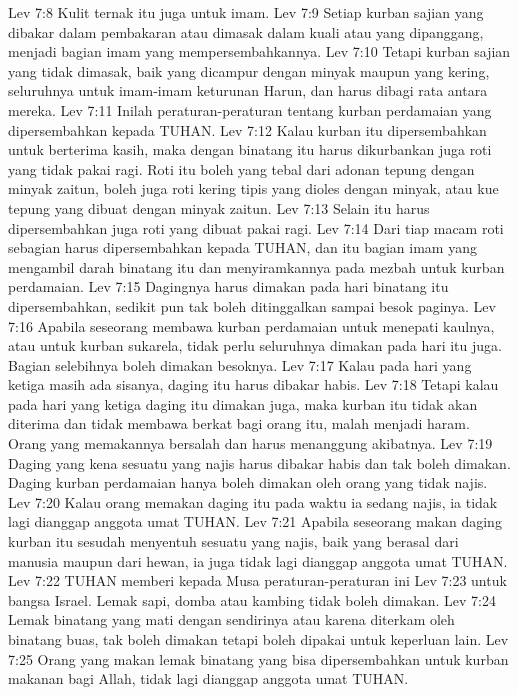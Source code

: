 Lev 7:8  Kulit ternak itu juga untuk imam.
Lev 7:9  Setiap kurban sajian yang dibakar dalam pembakaran atau dimasak dalam kuali atau yang dipanggang, menjadi bagian imam yang mempersembahkannya.
Lev 7:10  Tetapi kurban sajian yang tidak dimasak, baik yang dicampur dengan minyak maupun yang kering, seluruhnya untuk imam-imam keturunan Harun, dan harus dibagi rata antara mereka.
Lev 7:11  Inilah peraturan-peraturan tentang kurban perdamaian yang dipersembahkan kepada TUHAN.
Lev 7:12  Kalau kurban itu dipersembahkan untuk berterima kasih, maka dengan binatang itu harus dikurbankan juga roti yang tidak pakai ragi. Roti itu boleh yang tebal dari adonan tepung dengan minyak zaitun, boleh juga roti kering tipis yang dioles dengan minyak, atau kue tepung yang dibuat dengan minyak zaitun.
Lev 7:13  Selain itu harus dipersembahkan juga roti yang dibuat pakai ragi.
Lev 7:14  Dari tiap macam roti sebagian harus dipersembahkan kepada TUHAN, dan itu bagian imam yang mengambil darah binatang itu dan menyiramkannya pada mezbah untuk kurban perdamaian.
Lev 7:15  Dagingnya harus dimakan pada hari binatang itu dipersembahkan, sedikit pun tak boleh ditinggalkan sampai besok paginya.
Lev 7:16  Apabila seseorang membawa kurban perdamaian untuk menepati kaulnya, atau untuk kurban sukarela, tidak perlu seluruhnya dimakan pada hari itu juga. Bagian selebihnya boleh dimakan besoknya.
Lev 7:17  Kalau pada hari yang ketiga masih ada sisanya, daging itu harus dibakar habis.
Lev 7:18  Tetapi kalau pada hari yang ketiga daging itu dimakan juga, maka kurban itu tidak akan diterima dan tidak membawa berkat bagi orang itu, malah menjadi haram. Orang yang memakannya bersalah dan harus menanggung akibatnya.
Lev 7:19  Daging yang kena sesuatu yang najis harus dibakar habis dan tak boleh dimakan. Daging kurban perdamaian hanya boleh dimakan oleh orang yang tidak najis.
Lev 7:20  Kalau orang memakan daging itu pada waktu ia sedang najis, ia tidak lagi dianggap anggota umat TUHAN.
Lev 7:21  Apabila seseorang makan daging kurban itu sesudah menyentuh sesuatu yang najis, baik yang berasal dari manusia maupun dari hewan, ia juga tidak lagi dianggap anggota umat TUHAN.
Lev 7:22  TUHAN memberi kepada Musa peraturan-peraturan ini
Lev 7:23  untuk bangsa Israel. Lemak sapi, domba atau kambing tidak boleh dimakan.
Lev 7:24  Lemak binatang yang mati dengan sendirinya atau karena diterkam oleh binatang buas, tak boleh dimakan tetapi boleh dipakai untuk keperluan lain.
Lev 7:25  Orang yang makan lemak binatang yang bisa dipersembahkan untuk kurban makanan bagi Allah, tidak lagi dianggap anggota umat TUHAN.
